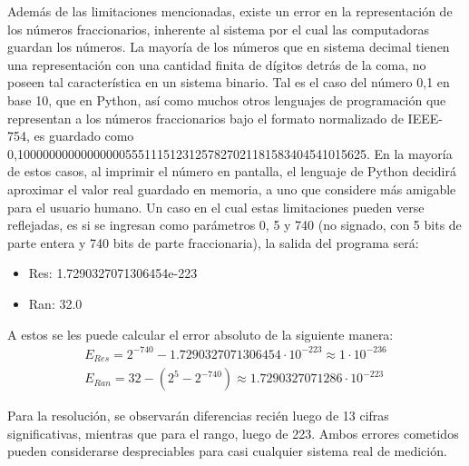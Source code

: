 Además de las limitaciones mencionadas, existe un error en la representación de los números fraccionarios, inherente al sistema por el cual las computadoras guardan los números.
La mayoría de los números que en sistema decimal tienen una representación con una cantidad finita de dígitos detrás de la coma, no poseen tal característica en un sistema binario.
Tal es el caso del número 0,1 en base 10, que en Python, así como muchos otros lenguajes de programación que representan a los números fraccionarios bajo el formato normalizado de IEEE-754, es guardado como 0,1000000000000000055511151231257827021181583404541015625.
En la mayoría de estos casos, al imprimir el número en pantalla, el lenguaje de Python decidirá aproximar el valor real guardado en memoria, a uno que considere más amigable para el usuario humano.
Un caso en el cual estas limitaciones pueden verse reflejadas, es si se ingresan como parámetros 0, 5 y 740 (no signado, con 5 bits de parte entera y 740 bits de parte fraccionaria), la salida del programa será:
\begin{itemize}
    \item Res: 1.7290327071306454e-223
    \item Ran: 32.0
\end{itemize}

A estos se les puede calcular el error absoluto de la siguiente manera:
\begin{align}
    E_{Res} = 2^{-740} - 1.7290327071306454 \cdot 10^{-223} \approx 1 \cdot 10^{-236} \\
    E_{Ran} = 32 - \left(2^{5} - 2^{-740}\right) \approx 1.7290327071286 \cdot 10^{-223}
\end{align}

Para la resolución, se observarán diferencias recién luego de 13 cifras significativas, mientras que para el rango, luego de 223.
Ambos errores cometidos pueden considerarse despreciables para casi cualquier sistema real de medición.